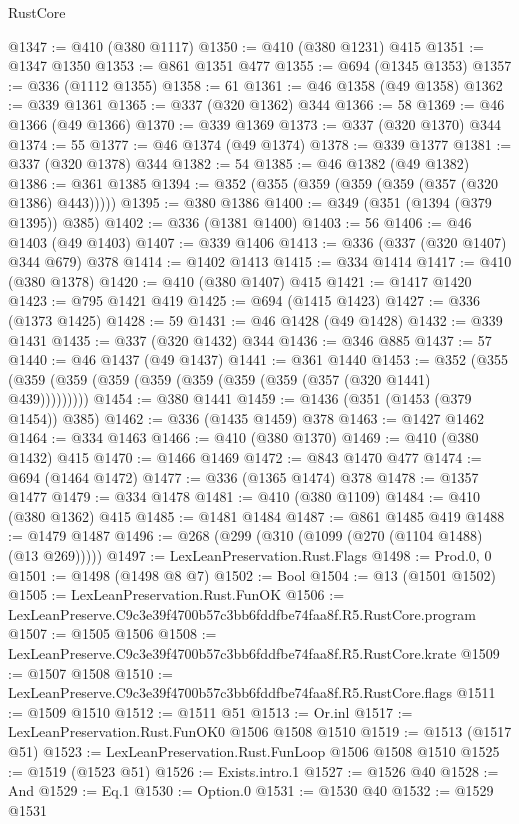 \begin{lexlean}{RustCore}
\begin{coremodule}
@1347 := @410 (@380 @1117)
@1350 := @410 (@380 @1231) @415
@1351 := @1347 @1350
@1353 := @861 @1351 @477
@1355 := @694 (@1345 @1353)
@1357 := @336 (@1112 @1355)
@1358 := 61
@1361 := @46 @1358 (@49 @1358)
@1362 := @339 @1361
@1365 := @337 (@320 @1362) @344
@1366 := 58
@1369 := @46 @1366 (@49 @1366)
@1370 := @339 @1369
@1373 := @337 (@320 @1370) @344
@1374 := 55
@1377 := @46 @1374 (@49 @1374)
@1378 := @339 @1377
@1381 := @337 (@320 @1378) @344
@1382 := 54
@1385 := @46 @1382 (@49 @1382)
@1386 := @361 @1385
@1394 := @352 (@355 (@359 (@359 (@359 (@357 (@320 @1386) @443)))))
@1395 := @380 @1386
@1400 := @349 (@351 (@1394 (@379 @1395)) @385)
@1402 := @336 (@1381 @1400)
@1403 := 56
@1406 := @46 @1403 (@49 @1403)
@1407 := @339 @1406
@1413 := @336 (@337 (@320 @1407) @344 @679) @378
@1414 := @1402 @1413
@1415 := @334 @1414
@1417 := @410 (@380 @1378)
@1420 := @410 (@380 @1407) @415
@1421 := @1417 @1420
@1423 := @795 @1421 @419
@1425 := @694 (@1415 @1423)
@1427 := @336 (@1373 @1425)
@1428 := 59
@1431 := @46 @1428 (@49 @1428)
@1432 := @339 @1431
@1435 := @337 (@320 @1432) @344
@1436 := @346 @885
@1437 := 57
@1440 := @46 @1437 (@49 @1437)
@1441 := @361 @1440
@1453 := @352 (@355 (@359 (@359 (@359 (@359 (@359 (@359 (@359 (@357 (@320 @1441) @439)))))))))
@1454 := @380 @1441
@1459 := @1436 (@351 (@1453 (@379 @1454)) @385)
@1462 := @336 (@1435 @1459) @378
@1463 := @1427 @1462
@1464 := @334 @1463
@1466 := @410 (@380 @1370)
@1469 := @410 (@380 @1432) @415
@1470 := @1466 @1469
@1472 := @843 @1470 @477
@1474 := @694 (@1464 @1472)
@1477 := @336 (@1365 @1474) @378
@1478 := @1357 @1477
@1479 := @334 @1478
@1481 := @410 (@380 @1109)
@1484 := @410 (@380 @1362) @415
@1485 := @1481 @1484
@1487 := @861 @1485 @419
@1488 := @1479 @1487
@1496 := @268 (@299 (@310 (@1099 (@270 (@1104 @1488) (@13 @269)))))
@1497 := LexLeanPreservation.Rust.Flags
@1498 := Prod.{0, 0}
@1501 := @1498 (@1498 @8 @7)
@1502 := Bool
@1504 := @13 (@1501 @1502)
@1505 := LexLeanPreservation.Rust.FunOK
@1506 := LexLeanPreserve.C9c3e39f4700b57c3bb6fddfbe74faa8f.R5.RustCore.program
@1507 := @1505 @1506
@1508 := LexLeanPreserve.C9c3e39f4700b57c3bb6fddfbe74faa8f.R5.RustCore.krate
@1509 := @1507 @1508
@1510 := LexLeanPreserve.C9c3e39f4700b57c3bb6fddfbe74faa8f.R5.RustCore.flags
@1511 := @1509 @1510
@1512 := @1511 @51
@1513 := Or.inl
@1517 := LexLeanPreservation.Rust.FunOK0 @1506 @1508 @1510
@1519 := @1513 (@1517 @51)
@1523 := LexLeanPreservation.Rust.FunLoop @1506 @1508 @1510
@1525 := @1519 (@1523 @51)
@1526 := Exists.intro.{1}
@1527 := @1526 @40
@1528 := And
@1529 := Eq.{1}
@1530 := Option.{0}
@1531 := @1530 @40
@1532 := @1529 @1531

\end{coremodule}
\end{lexlean}
